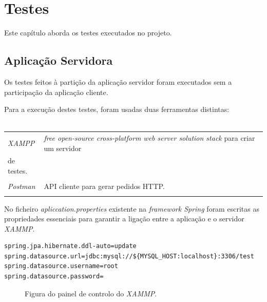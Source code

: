 %
%
%
\chapter{Testes} \label{testes}
Este capítulo aborda os testes executados no projeto.

\section{Aplicação Servidora} \label{sec51}
Os testes feitos à partição da aplicação servidor foram executados sem a participação da aplicação cliente.

Para a execução destes testes, foram usadas duas ferramentas distintas:\\
\\
\begin{tabular}{ll}
	\emph{XAMPP} & \emph{free open-source cross-platform web server solution stack} para criar um servidor\\
	 de testes.\\
	 \\
	\emph{Postman} & API cliente para gerar pedidos HTTP.\\
	\\
\end{tabular}

No ficheiro \emph{apliccation.properties} existente na \emph{framework Spring} foram escritas as propriedades essenciais para garantir a ligação entre a aplicação e o servidor \emph{XAMMP}.

\begin{verbatim}
spring.jpa.hibernate.ddl-auto=update
spring.datasource.url=jdbc:mysql://${MYSQL_HOST:localhost}:3306/test
spring.datasource.username=root
spring.datasource.password=
\end{verbatim}

\begin{figure}[h]
	\begin{center}
	\end{center}
	\caption{Figura do painel de controlo do \emph{XAMMP}.}\label{fig:logotipo}
\end{figure}

